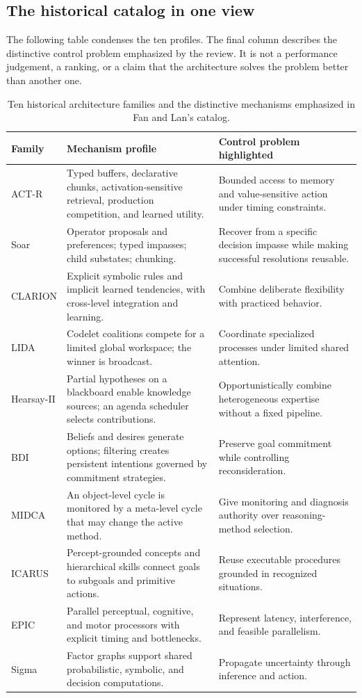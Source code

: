 \subsection{The historical catalog in one view}

The following table condenses the ten profiles. The final column describes the distinctive control problem emphasized by the review. It is not a performance judgement, a ranking, or a claim that the architecture solves the problem better than another one.

\begin{table}[tbp]
\centering
\small
\caption{Ten historical architecture families and the distinctive mechanisms emphasized in Fan and Lan's catalog.}
\label{tab:ch11-historical-catalog}
\begin{tabularx}{\textwidth}{@{}p{}p{}X@{}}
\toprule
\textbf{Family} & \textbf{Mechanism profile} & \textbf{Control problem highlighted}\\
\midrule
ACT-R & Typed buffers, declarative chunks, activation-sensitive retrieval, production competition, and learned utility. & Bounded access to memory and value-sensitive action under timing constraints.\\
Soar & Operator proposals and preferences; typed impasses; child substates; chunking. & Recover from a specific decision impasse while making successful resolutions reusable.\\
CLARION & Explicit symbolic rules and implicit learned tendencies, with cross-level integration and learning. & Combine deliberate flexibility with practiced behavior.\\
LIDA & Codelet coalitions compete for a limited global workspace; the winner is broadcast. & Coordinate specialized processes under limited shared attention.\\
Hearsay-II & Partial hypotheses on a blackboard enable knowledge sources; an agenda scheduler selects contributions. & Opportunistically combine heterogeneous expertise without a fixed pipeline.\\
BDI & Beliefs and desires generate options; filtering creates persistent intentions governed by commitment strategies. & Preserve goal commitment while controlling reconsideration.\\
MIDCA & An object-level cycle is monitored by a meta-level cycle that may change the active method. & Give monitoring and diagnosis authority over reasoning-method selection.\\
ICARUS & Percept-grounded concepts and hierarchical skills connect goals to subgoals and primitive actions. & Reuse executable procedures grounded in recognized situations.\\
EPIC & Parallel perceptual, cognitive, and motor processors with explicit timing and bottlenecks. & Represent latency, interference, and feasible parallelism.\\
Sigma & Factor graphs support shared probabilistic, symbolic, and decision computations. & Propagate uncertainty through inference and action.\\
\bottomrule
\end{tabularx}
\end{table}

